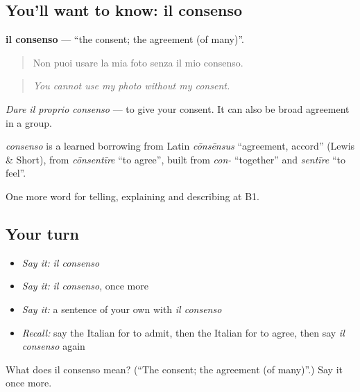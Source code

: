 \subsection*{You'll want to know: il consenso}
\textbf{il consenso} — \textquotedblleft{}the consent; the agreement (of many)\textquotedblright{}.

\begin{quote}
Non puoi usare la mia foto senza il mio consenso.
\end{quote}

\begin{quote}
\emph{You cannot use my photo without my consent.}
\end{quote}

\emph{Dare il proprio consenso} — to give your consent. It can also be broad agreement in a group.

\begin{cousinweb}
\emph{consenso} is a learned borrowing from Latin \emph{cōnsēnsus} \textquotedblleft{}agreement, accord\textquotedblright{} (Lewis \& Short), from \emph{cōnsentīre} \textquotedblleft{}to agree\textquotedblright{}, built from \emph{con-} \textquotedblleft{}together\textquotedblright{} and \emph{sentīre} \textquotedblleft{}to feel\textquotedblright{}.
\end{cousinweb}

\begin{grammarlens}[title={What you've built}]
One more word for telling, explaining and describing at B1.
\end{grammarlens}

\subsection*{Your turn}
\begin{itemize}
\raggedright
  \item \emph{Say it:} \emph{il consenso}
  \item \emph{Say it:} \emph{il consenso}, once more
  \item \emph{Say it:} a sentence of your own with \emph{il consenso}
  \item \emph{Recall:} say the Italian for to admit, then the Italian for to agree, then say \emph{il consenso} again
\end{itemize}

\begin{tcolorbox}[breakable,colback=teal!4,colframe=teal!35!black,title={Before you move on}]
What does il consenso mean? (\textquotedblleft{}The consent; the agreement (of many)\textquotedblright{}.) Say it once more.
\end{tcolorbox}
